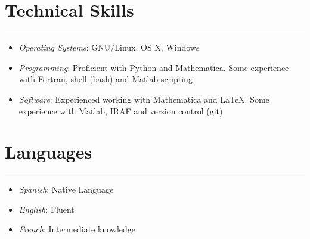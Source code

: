 \documentclass[letterpaper,10pt]{article}
\begin{document}
\section*{Technical Skills}
\hrule
\vspace{.3 cm}


  \begin{itemize}[label=$\blacktriangleright$]
  \item \emph{Operating Systems}: GNU/Linux, OS X, Windows
    \end{itemize}

\begin{itemize}[label=$\blacktriangleright$]
  \item \emph{Programming}: Proficient with Python and Mathematica. Some experience with Fortran, shell (bash) and  Matlab  scripting
  \end{itemize}
  

  \begin{itemize}[label=$\blacktriangleright$]
  \item \emph{Software}: Experienced working with Mathematica and \LaTeX. Some experience with Matlab, IRAF and version control (git)  
    \end{itemize}


\section*{Languages}
\hrule
\vspace{.3 cm}
\begin{itemize}[label=$\blacktriangleright$]
\item \emph{Spanish}: Native Language
\item \emph{English}: Fluent
\item \emph{French}: Intermediate knowledge
\end{itemize}
\end{document}
